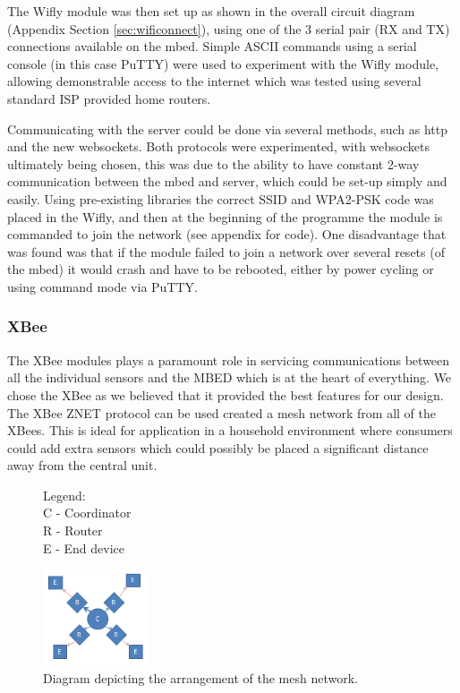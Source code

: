 \documentclass[10.5pt,a4paper,twoside]{report}   %
\begin{document}
The Wifly module was then set up as shown in the overall circuit diagram (Appendix Section \ref{sec:wificonnect}), using one of the 3 serial pair (RX and TX) connections available on the mbed. Simple ASCII commands using a serial console (in this case PuTTY) were used to experiment with the Wifly module, allowing demonstrable access to the internet which was tested using several standard ISP provided home routers. 

Communicating with the server could be done via several methods, such as http and the new websockets. Both protocols were experimented, with websockets ultimately being chosen, this was due to the ability to have constant 2-way communication between the mbed and server, which could be set-up simply and easily. Using pre-existing libraries the correct SSID and WPA2-PSK code was placed in the Wifly, and then at the beginning of the programme the module is commanded to join the network (see appendix for code). One disadvantage that was found was that if the module failed to join a network over several resets (of the mbed) it would crash and have to be rebooted, either by power cycling or using command mode via PuTTY.
\subsubsection{XBee}
The XBee modules plays a paramount role in servicing communications between all the individual sensors and the MBED which is at the heart of everything. We chose the XBee as we believed that it provided the best features for our design. The XBee ZNET protocol can be used created a mesh network from all of the XBees. This is ideal for application in a household environment where consumers could add extra sensors which could possibly be placed a significant distance away from the central unit.

\begin{figure}
  \vspace{-20pt}
  Legend:\\
  C - Coordinator\\
  R - Router\\
  E - End device
  \begin{center}
    \includegraphics[width=0.28\textwidth]{images/xbeemesh.png}
  \end{center}
  \vspace{-20pt}
  \caption{Diagram depicting the arrangement of the mesh network.}
\label{fig:xbeemesh}
  \vspace{-10pt}
\end{figure}
\end{document}
